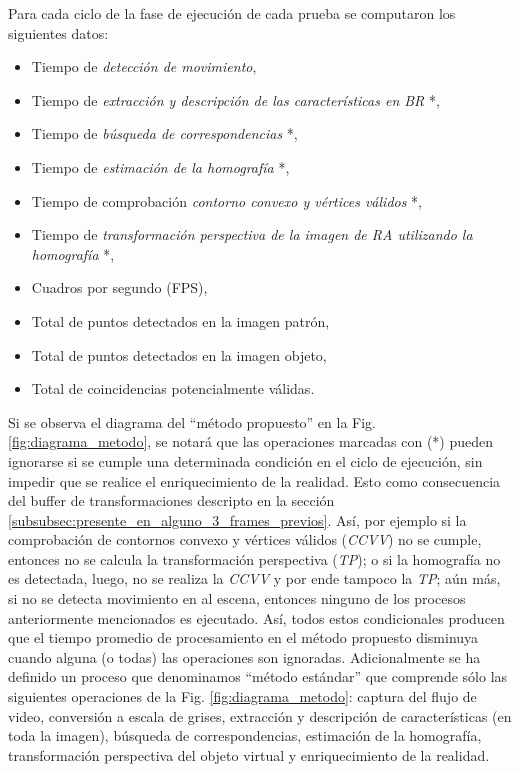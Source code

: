 Para cada ciclo de la fase de ejecución de cada prueba se computaron los siguientes datos:
\begin{itemize}
 \item Tiempo de \textit{detección de movimiento},
 \item Tiempo de \textit{extracción y descripción de las características en BR} *,
 \item Tiempo de \textit{búsqueda de correspondencias} *,
 \item Tiempo de \textit{estimación de la homografía} *,
 \item Tiempo de comprobación \textit{contorno convexo y vértices válidos} *,
 \item Tiempo de \textit{transformación perspectiva de la imagen de RA utilizando la homografía} *,
 \item Cuadros por segundo (FPS),
 \item Total de puntos detectados en la imagen patrón,
 \item Total de puntos detectados en la imagen objeto,
 \item Total de coincidencias potencialmente válidas.
\end{itemize}

Si se observa el diagrama del ``método propuesto'' en la Fig. \ref{fig:diagrama_metodo}, se notará que las operaciones marcadas con (*) pueden ignorarse si se cumple una determinada condición en el ciclo de ejecución, sin impedir que se realice el enriquecimiento de la realidad. Esto como consecuencia del buffer de transformaciones descripto en la sección \ref{subsubsec:presente_en_alguno_3_frames_previos}. Así, por ejemplo si la comprobación de contornos convexo y vértices válidos (\textit{CCVV}) no se cumple, entonces no se calcula la transformación perspectiva (\textit{TP});  o si la homografía no es detectada, luego, no se realiza la \textit{CCVV} y por ende tampoco la \textit{TP}; aún más, si no se detecta movimiento en al escena, entonces ninguno de los procesos anteriormente mencionados es ejecutado. Así, todos estos condicionales producen que el tiempo promedio de procesamiento en el método propuesto disminuya cuando alguna (o todas) las operaciones son ignoradas. Adicionalmente se ha definido un proceso que denominamos ``método estándar'' que comprende sólo las siguientes operaciones de la Fig. \ref{fig:diagrama_metodo}: captura del flujo de video, conversión a escala de grises, extracción y descripción de características (en toda la imagen), búsqueda de correspondencias, estimación de la homografía, transformación perspectiva del objeto virtual y enriquecimiento de la realidad.
% 

